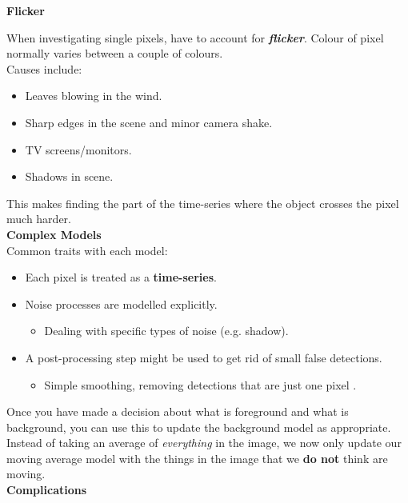 \documentclass[english, 10pt]{article}
\begin{document}
\textbf{Flicker}

When investigating single pixels, have to account for \textbf{\textit{flicker}}. Colour of pixel normally varies between a couple of colours. \\

Causes include:

\begin{itemize}
\item Leaves blowing in the wind.
\item Sharp edges in the scene and minor camera shake.
\item TV screens/monitors.
\item Shadows in scene.
\end{itemize}

This makes finding the part of the time-series where the object crosses the pixel much harder.\\

\textbf{Complex Models} \\

Common traits with each model:

\begin{itemize}
\item Each pixel is treated as a \textbf{time-series}.
\item Noise processes are modelled explicitly.
\begin{itemize}
\item Dealing with specific types of noise (e.g. shadow).
\end{itemize}
\item A post-processing step might be used to get rid of small false detections.
\begin{itemize}
\item Simple smoothing, removing detections that are just one pixel .
\end{itemize}
\end{itemize}

Once you have made a decision about what is foreground and what is background, you can use this to update the background model as appropriate. \\

Instead of taking an average of \textit{everything} in the image, we now only update our moving average model with the things in the image that we \textbf{do not} think are moving. \\

\textbf{Complications}
\end{document}
